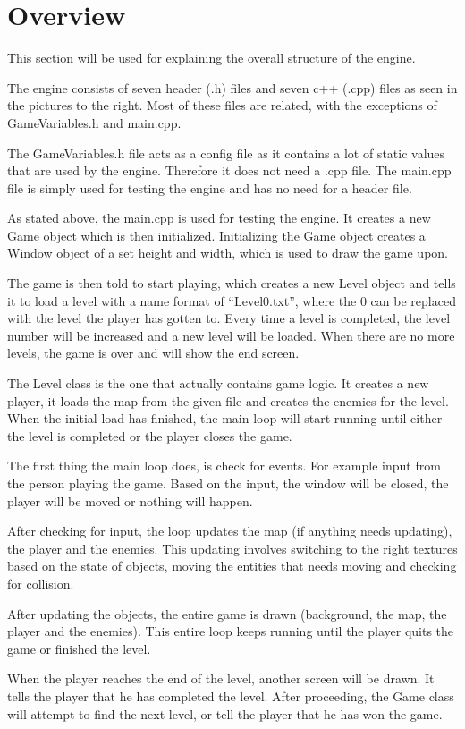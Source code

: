 \section{Overview}
\label{03}

This section will be used for explaining the overall structure of the engine.

The engine consists of seven header (.h) files and seven c++ (.cpp) files as seen in the pictures to the right. Most of these files are related, with the exceptions of GameVariables.h and main.cpp.

The GameVariables.h file acts as a config file as it contains a lot of static values that are used by the engine. Therefore it does not need a .cpp file. The main.cpp file is simply used for testing the engine and has no need for a header file.

As stated above, the main.cpp is used for testing the engine. It creates a new Game object which is then initialized. Initializing the Game object creates a Window object of a set height and width, which is used to draw the game upon.

The game is then told to start playing, which creates a new Level object and tells it to load a level with a name format of “Level0.txt”, where the 0 can be replaced with the level the player has gotten to. Every time a level is completed, the level number will be increased and a new level will be loaded. When there are no more levels, the game is over and will show the end screen.

The Level class is the one that actually contains game logic. It creates a new player, it loads the map from the given file and creates the enemies for the level. When the initial load has finished, the main loop will start running until either the level is completed or the player closes the game. 

The first thing the main loop does, is check for events. For example input from the person playing the game. Based on the input, the window will be closed, the player will be moved or nothing will happen. 

After checking for input, the loop updates the map (if anything needs updating), the player and the enemies. This updating involves switching to the right textures based on the state of objects, moving the entities that needs moving and checking for collision. 

After updating the objects, the entire game is drawn (background, the map, the player and the enemies). This entire loop keeps running until the player quits the game or finished the level.

When the player reaches the end of the level, another screen will be drawn. It tells the player that he has completed the level. After proceeding, the Game class will attempt to find the next level, or tell the player that he has won the game.